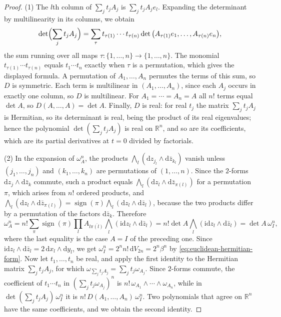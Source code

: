 \begin{proof}
(1) The $l$th column of $\sum_jt_jA_j$ is $\sum_jt_jA_je_l$. Expanding the determinant by multilinearity in its columns, we obtain
\[
 \det\Bigl(\sum_jt_jA_j\Bigr)=\sum_\tau t_{\tau(1)}\cdots t_{\tau(n)}\det\big(A_{\tau(1)}e_1,\ldots,A_{\tau(n)}e_n\big),
\]
the sum running over all maps $\tau\colon\{1,\ldots,n\}\to\{1,\ldots,n\}$. The monomial $t_{\tau(1)}\cdots t_{\tau(n)}$ equals $t_1\cdots t_n$ exactly when $\tau$ is a permutation, which gives the displayed formula. A permutation of $A_1,\ldots,A_n$ permutes the terms of this sum, so $D$ is symmetric. Each term is multilinear in $(A_1,\ldots,A_n)$, since each $A_j$ occurs in exactly one column, so $D$ is multilinear. For $A_1=\cdots=A_n=A$ all $n!$ terms equal $\det A$, so $D(A,\ldots,A)=\det A$. Finally, $D$ is real: for real $t_j$ the matrix $\sum_jt_jA_j$ is Hermitian, so its determinant is real, being the product of its real eigenvalues; hence the polynomial $\det(\sum_jt_jA_j)$ is real on $\mathbb R^n$, and so are its coefficients, which are its partial derivatives at $t=0$ divided by factorials.

(2) In the expansion of $\omega_A^n$, the products $\bigwedge_l(\mathrm dz_{j_l}\wedge\mathrm d\bar z_{k_l})$ vanish unless $(j_1,\ldots,j_n)$ and $(k_1,\ldots,k_n)$ are permutations of $(1,\ldots,n)$. Since the $2$-forms $\mathrm dz_j\wedge\mathrm d\bar z_k$ commute, such a product equals $\bigwedge_l(\mathrm dz_l\wedge\mathrm d\bar z_{\pi(l)})$ for a permutation $\pi$, which arises from $n!$ ordered products, and $\bigwedge_l(\mathrm dz_l\wedge\mathrm d\bar z_{\pi(l)})=\operatorname{sign}(\pi)\bigwedge_l(\mathrm dz_l\wedge\mathrm d\bar z_l)$, because the two products differ by a permutation of the factors $\mathrm d\bar z_k$. Therefore
\[
 \omega_A^n=n!\sum_\pi\operatorname{sign}(\pi)\prod_lA_{l\overline{\pi(l)}}\bigwedge_l(\mathrm i\mathrm dz_l\wedge\mathrm d\bar z_l)=n!\det A\bigwedge_l(\mathrm i\mathrm dz_l\wedge\mathrm d\bar z_l)=\det A\,\omega_I^n,
\]
where the last equality is the case $A=I$ of the preceding one. Since $\mathrm i\mathrm dz_l\wedge\mathrm d\bar z_l=2\,\mathrm dx_l\wedge\mathrm dy_l$, we get $\omega_I^n=2^nn!\,\mathrm dV_{2n}=2^n\beta^n$ by \eqref{eq:euclidean-hermitian-form}. Now let $t_1,\ldots,t_n$ be real, and apply the first identity to the Hermitian matrix $\sum_jt_jA_j$, for which $\omega_{\sum_jt_jA_j}=\sum_jt_j\omega_{A_j}$. Since $2$-forms commute, the coefficient of $t_1\cdots t_n$ in $(\sum_jt_j\omega_{A_j})^n$ is $n!\,\omega_{A_1}\wedge\cdots\wedge\omega_{A_n}$, while in $\det(\sum_jt_jA_j)\,\omega_I^n$ it is $n!\,D(A_1,\ldots,A_n)\,\omega_I^n$. Two polynomials that agree on $\mathbb R^n$ have the same coefficients, and we obtain the second identity.


\end{proof}
